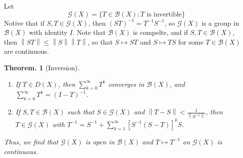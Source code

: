 \documentclass[11pt, a4paper]{memoir}
\newcommand{\norm}[1]{\ensuremath{\left\lVert#1\right\rVert}}
\theoremstyle{change}
\newtheorem{theorem}{Theorem.}[section]
\theoremstyle{plain}
\theoremstyle{nonumberplain}
\numberwithin{equation}{section}
\begin{document}
Let
\begin{equation*}
    \mathcal{G}(X)=\{T\in\mathcal{B}(X):T\text{ is invertible}\}
\end{equation*}
Notive that if $S,T\in\mathcal{G}(X)$, then $(ST)^{-1}=T^{-1}S^{-1}$, so $\mathcal{G}(X)$ is a group in $\mathcal{B}(X)$ with identity $I$.
Note that $\mathcal{B}(X)$ is compelte, and if $S,T\in\mathcal{B}(X)$, then $\norm{ST}\leq\norm{S}\norm{T}$, so that $S\mapsto ST$ and $S\mapsto TS$ for some $T\in\mathcal{B}(X)$ are continuous.
\begin{theorem}[Inversion]
    \begin{enumerate}[nl,r]
        \item If $T\in D(X)$, then $\sum_{k=0}^\infty T^k$ converges in $\mathcal{B}(X)$, and $\sum_{k=0}^\infty T^k=(I-T)^{-1}$.
        \item If $S,T\in\mathcal{B}(X)$ such that $S\in\mathcal{G}(X)$ and $\norm{T-S}<\frac{1}{\norm{S^{-1}}}$, then $T\in\mathcal{G}(X)$ with $T^{-1}=S^{-1}+\sum_{k=1}^\infty[S^{-1}(S-T)]^kS$.
    \end{enumerate}
    Thus, we find that $\mathcal{G}(X)$ is open in $\mathcal{B}(X)$ and $T\mapsto T^{-1}$ on $\mathcal{G}(X)$ is continuous.
\end{theorem}
\end{document}
